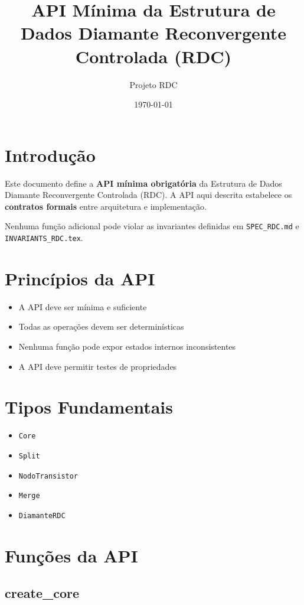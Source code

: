 \documentclass[12pt,a4paper]{article}
\title{API Mínima da Estrutura de Dados Diamante Reconvergente Controlada (RDC)}
\author{Projeto RDC}
\date{\today}
\begin{document}
	\maketitle
	
	\section{Introdução}
	
	Este documento define a \textbf{API mínima obrigatória} da Estrutura de Dados
	Diamante Reconvergente Controlada (RDC). A API aqui descrita estabelece os
	\textbf{contratos formais} entre arquitetura e implementação.
	
	Nenhuma função adicional pode violar as invariantes definidas em
	\texttt{SPEC\_RDC.md} e \texttt{INVARIANTS\_RDC.tex}.
	
	\section{Princípios da API}
	
	\begin{itemize}[leftmargin=2em]
		\item A API deve ser mínima e suficiente
		\item Todas as operações devem ser determinísticas
		\item Nenhuma função pode expor estados internos inconsistentes
		\item A API deve permitir testes de propriedades
	\end{itemize}
	
	\section{Tipos Fundamentais}
	
	\begin{itemize}[leftmargin=2em]
		\item \texttt{Core}
		\item \texttt{Split}
		\item \texttt{NodoTransistor}
		\item \texttt{Merge}
		\item \texttt{DiamanteRDC}
	\end{itemize}
	
	\section{Funções da API}
	
	\subsection{create\_core}
	
\end{document}
